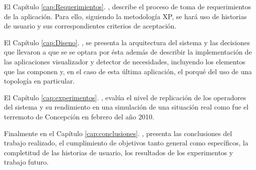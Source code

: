 El Capítulo \ref{cap:Requerimientos}. , describe el proceso de toma de requerimientos de la aplicación. Para ello, siguiendo la metodología XP, se hará uso de historias de usuario y sus correspondientes criterios de aceptación.

El Capítulo \ref{cap:Diseno}. , se presenta la arquitectura del sistema y las decisiones que llevaron a que se se optara por ésta además de describir la implementación de las aplicaciones visualizador y detector de necesidades, incluyendo los elementos que las componen y, en el caso de esta última aplicación, el porqué del uso de una topología en particular.

El Capítulo \ref{cap:experimentos}. , evalúa el nivel de replicación de los operadores del sistema y su rendimiento en una simulación de una situación real como fue el terremoto de Concepción en febrero del año 2010.

Finalmente en el Capítulo \ref{cap:conclusiones}. , presenta las conclusiones del trabajo realizado, el cumplimiento de objetivos tanto general como específicos, la completitud de las historias de usuario, los resultados de los experimentos y trabajo futuro.